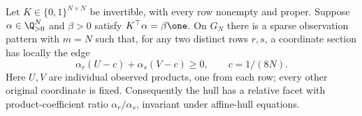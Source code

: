 \begin{lemma}\label{lem:balanced-incidence}
Let $K\in\{0,1\}^{N\times N}$ be invertible, with every row nonempty
and proper. Suppose $\alpha\in\Q_{>0}^N$ and $\beta>0$ satisfy
$K^\top\alpha=\beta\one$. On $G_N$ there is a sparse observation
pattern with $m=N$ such that, for any two distinct rows $r,s$, a
coordinate section has locally the edge
\begin{equation}\label{eq:balanced-edge}
 \alpha_r(U-c)+\alpha_s(V-c)\ge0,
 \qquad c=1/(8N).
\end{equation}
Here $U,V$ are individual observed products, one from each row;
every other original coordinate is fixed. Consequently the hull has a
relative facet with product-coefficient ratio $\alpha_r/\alpha_s$,
invariant under affine-hull equations.
\end{lemma}

